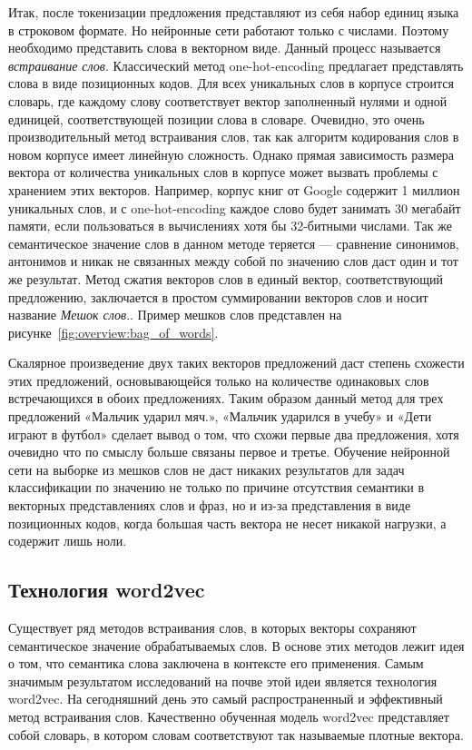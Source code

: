 Итак, после токенизации предложения представляют из себя набор единиц языка в строковом формате. Но нейронные сети работают только с числами. Поэтому необходимо представить слова в векторном виде. Данный процесс называется \textit{встраивание слов}. Классический метод one-hot-encoding предлагает представлять слова в виде позиционных кодов. Для всех уникальных слов в корпусе строится словарь, где каждому слову соответствует вектор заполненный нулями и одной единицей, соответствующей позиции слова в словаре. Очевидно, это очень производительный метод встраивания слов, так как алгоритм кодирования слов в новом корпусе имеет линейную сложность. Однако прямая зависимость размера вектора от количества уникальных слов в корпусе может вызвать проблемы с хранением этих векторов. Например, корпус книг от Google содержит 1 миллион уникальных слов, и с one-hot-encoding каждое слово будет занимать 30 мегабайт памяти, если пользоваться в вычислениях хотя бы 32-битными числами. Так же семантическое значение слов в данном методе теряется --- сравнение синонимов, антонимов и никак не связанных между собой по значению слов даст один и тот же результат. Метод сжатия векторов слов в единый вектор, соответствующий предложению, заключается в простом суммировании векторов слов и носит название \textit{Мешок слов}.\cite{Goodfellow-et-al-2016}. Пример мешков слов представлен на рисунке~\ref{fig:overview:bag_of_words}.

Скалярное произведение двух таких векторов предложений даст степень схожести этих предложений, основывающейся только на количестве одинаковых слов встречающихся в обоих предложениях. Таким образом данный метод для трех предложений «Мальчик ударил мяч.», «Мальчик ударился в учебу» и «Дети играют в футбол» сделает вывод о том, что схожи первые два предложения, хотя очевидно что по смыслу больше связаны первое и третье. Обучение нейронной сети на выборке из мешков слов не даст никаких результатов для задач классификации по значению не только по причине отсутствия семантики в векторных представлениях слов и фраз, но и из-за представления в виде позиционных кодов, когда большая часть вектора не несет никакой нагрузки, а содержит лишь ноли\cite{Goodfellow-et-al-2016}.
\subsection{Технология word2vec}\label{subsec:overview:overview_word2vec}
Существует ряд методов встраивания слов, в которых векторы сохраняют семантическое значение обрабатываемых слов. В основе этих методов лежит идея о том, что семантика слова заключена в контексте его применения. Самым значимым результатом исследований на почве этой идеи является технология word2vec. На сегодняшний день это самый распространенный и эффективный метод встраивания слов. Качественно обученная модель word2vec представляет собой словарь, в котором словам соответствуют так называемые плотные вектора\cite{word2vec}.

